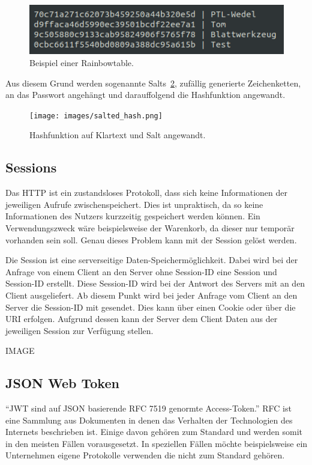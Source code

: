 \documentclass[paper=a4,fontsize=12pt,parskip=half]{scrartcl}
\begin{document}
	\begin{figure}[h]
		\includegraphics[width=\textwidth]{images/rainbowtable.png}
		\caption{Beispiel einer Rainbowtable.}
		\label{fig:rainbowtable}
	\end{figure}
	
	Aus diesem Grund werden sogenannte Salts~\ref{fig:salted-hash}, zufällig generierte Zeichenketten, an das Passwort angehängt und darauffolgend die Hashfunktion angewandt.

	\begin{figure}[h]
		\texttt{[image: images/salted\_hash.png]}
		\caption{Hashfunktion auf Klartext und Salt angewandt.}
		\label{fig:salted-hash}
	\end{figure}
		
	\subsection{Sessions}
	\label{sec: sessions}
	
	Das \gls{HTTP} ist ein zustandsloses Protokoll, dass sich keine Informationen der jeweiligen Aufrufe zwischenspeichert. Dies ist unpraktisch, da so keine Informationen des Nutzers kurzzeitig gespeichert werden können. Ein Verwendungszweck wäre beispielsweise der Warenkorb, da dieser nur temporär vorhanden sein soll. Genau dieses Problem kann mit der Session gelöst werden.
	
	Die Session ist eine serverseitige Daten-Speichermöglichkeit. Dabei wird bei der Anfrage von einem Client an den Server ohne Session-ID eine Session und Session-ID erstellt. Diese Session-ID wird bei der Antwort des Servers mit an den Client ausgeliefert. Ab diesem Punkt wird bei jeder Anfrage vom Client an den Server die Session-ID mit gesendet. Dies kann über einen Cookie oder über die \gls{URI} erfolgen. Aufgrund dessen kann der Server dem Client Daten aus der jeweiligen Session zur Verfügung stellen.
	
	IMAGE
	
	\subsection{JSON Web Token}
	\label{sec: jwt}
	\enquote{\gls{JWT} sind auf \gls{JSON} basierende \gls{RFC} 7519 genormte Access-Token.} \gls{RFC} ist eine Sammlung aus Dokumenten in denen das Verhalten der Technologien des Internets beschrieben ist. Einige davon gehören zum Standard und werden somit in den meisten Fällen vorausgesetzt. In speziellen Fällen möchte beispielsweise ein Unternehmen eigene Protokolle verwenden die nicht zum Standard gehören. 
	
\end{document}
